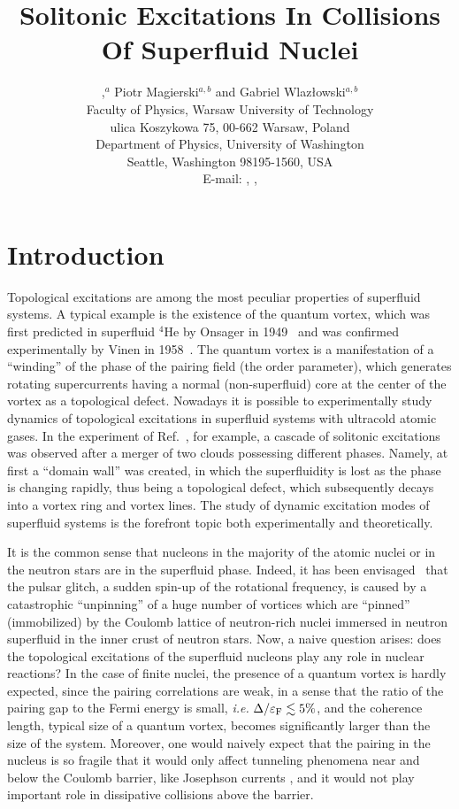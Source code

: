 \documentclass{PoS}
\title{Solitonic Excitations In Collisions Of Superfluid Nuclei}
\author{
\speaker{Kazuyuki Sekizawa},$^a$ Piotr Magierski$^{a,b}$ and Gabriel Wlaz{\l}owski$^{a,b}$\\
\llap{$^a$}Faculty of Physics, Warsaw University of Technology\\
ulica Koszykowa 75, 00-662 Warsaw, Poland\\
\llap{$^b$}Department of Physics, University of Washington\\
Seattle, Washington 98195-1560, USA\\
E-mail: \email{sekizawa@if.pw.edu.pl}, \email{magiersk@if.pw.edu.pl}, \email{gabrielw@if.pw.edu.pl}
}
\begin{document}

\section{Introduction}

Topological excitations are among the most peculiar properties of superfluid
systems. A typical example is the existence of the quantum vortex, which was
first predicted in superfluid $^4$He by Onsager in 1949~\cite{Onsager(1949)}
and was confirmed experimentally by Vinen in 1958~\cite{Vinen(1958)}.
The quantum vortex is a manifestation of a ``winding'' of the phase of the
pairing field (the order parameter), which generates rotating supercurrents
having a normal (non-superfluid) core at the center of the vortex as a topological
defect. Nowadays it is possible to experimentally study dynamics of topological
excitations in superfluid systems with ultracold atomic gases. In the experiment
of Ref.~\cite{Ku(2016)}, for example, a cascade of solitonic excitations was
observed after a merger of two clouds possessing different phases. Namely, at first a
``domain wall'' was created, in which the superfluidity is lost as the phase
is changing rapidly, thus being a topological defect, which subsequently decays into a vortex
ring and vortex lines. The study of dynamic excitation modes of superfluid systems
is the forefront topic both experimentally and theoretically.

It is the common sense that nucleons in the majority of the atomic nuclei or
in the neutron stars are in the superfluid phase. Indeed, it has been envisaged~\cite{Anderson-Itoh(1975)}
that the pulsar glitch, a sudden spin-up of the rotational frequency, is caused
by a catastrophic ``unpinning'' of a huge number of vortices which are ``pinned''
(immobilized) by the Coulomb lattice of neutron-rich nuclei immersed in neutron
superfluid in the inner crust of neutron stars. Now, a naive question arises: does
the topological excitations of the superfluid nucleons play any role in nuclear reactions?
In the case of finite nuclei, the presence of a quantum vortex is hardly expected, since
the pairing correlations are weak, in a sense that the ratio of the pairing gap to the
Fermi energy is small, \textit{i.e.} $\Delta/\varepsilon_{\rm F} \lesssim 5\%$,
and the coherence length, typical size of a quantum vortex, becomes significantly larger
than the size of the system. Moreover, one would naively expect that the pairing in
the nucleus is so fragile that it would only affect tunneling phenomena near and below
the Coulomb barrier, like Josephson currents \cite{Dietrich(1970)}, and it would not
play important role in dissipative collisions above the barrier.
\end{document}
